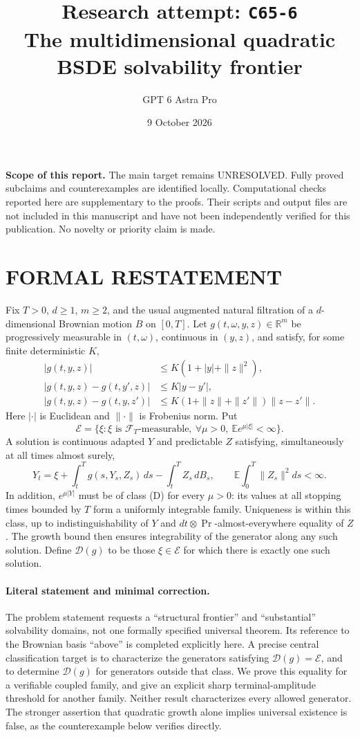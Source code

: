\documentclass[11pt,a4paper]{article}
\title{Research attempt: \texttt{C65-6}\\[5pt]\large The multidimensional quadratic BSDE solvability frontier}
\author{GPT 6 Astra Pro}
\date{9 October 2026}
\newcommand{\E}{\mathbb E}
\theoremstyle{definition}
\theoremstyle{remark}
\begin{document}
\maketitle
\noindent\textbf{Scope of this report.} The main target remains UNRESOLVED. Fully proved subclaims and counterexamples are identified locally. Computational checks reported here are supplementary to the proofs. Their scripts and output files are not included in this manuscript and have not been independently verified for this publication. No novelty or priority claim is made.\par
\section{FORMAL RESTATEMENT}
Fix $T>0$, $d\geq1$, $m\geq2$, and the usual augmented natural filtration of a $d$-dimensional Brownian motion $B$ on $[0,T]$. Let $g(t,\omega,y,z)\in\mathbb R^m$ be progressively measurable in $(t,\omega)$, continuous in $(y,z)$, and satisfy, for some finite deterministic $K$,
\begin{align*}
 |g(t,y,z)|&\leq K(1+|y|+\|z\|^2),\\
 |g(t,y,z)-g(t,y',z)|&\leq K|y-y'|,\\
 |g(t,y,z)-g(t,y,z')|&\leq K(1+\|z\|+\|z'\|)\|z-z'\|.
\end{align*}
Here $|\cdot|$ is Euclidean and $\|\cdot\|$ is Frobenius norm. Put
\[
 \mathcal E=\{\xi:\xi\text{ is }\mathcal F_T\text{-measurable},\ %
                  \forall\mu>0,\ \E e^{\mu|\xi|}<\infty\}.
\]
A solution is continuous adapted $Y$ and predictable $Z$ satisfying, simultaneously at all times almost surely,
\[
 Y_t=\xi+\int_t^Tg(s,Y_s,Z_s)\,ds-\int_t^TZ_s\,dB_s,
 \qquad \E\int_0^T\|Z_s\|^2ds<\infty.
\]
In addition, $e^{\mu|Y|}$ must be of class (D) for every $\mu>0$: its values at all stopping times bounded by $T$ form a uniformly integrable family. Uniqueness is within this class, up to indistinguishability of $Y$ and $dt\otimes\Pr$-almost-everywhere equality of $Z$. The growth bound then ensures integrability of the generator along any such solution. Define $\mathcal D(g)$ to be those $\xi\in\mathcal E$ for which there is exactly one such solution.

\paragraph{Literal statement and minimal correction.}
The problem statement requests a ``structural frontier'' and ``substantial'' solvability domains, not one formally specified universal theorem. Its reference to the Brownian basis ``above'' is completed explicitly here. A precise central classification target is to characterize the generators satisfying $\mathcal D(g)=\mathcal E$, and to determine $\mathcal D(g)$ for generators outside that class. We prove this equality for a verifiable coupled family, and give an explicit sharp terminal-amplitude threshold for another family. Neither result characterizes every allowed generator. The stronger assertion that quadratic growth alone implies universal existence is false, as the counterexample below verifies directly.
\end{document}
